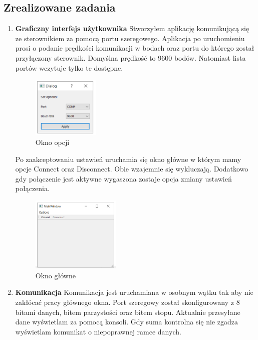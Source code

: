 \documentclass[10pt, a4paper]{article}
\begin{document}
		\subsection{Zrealizowane zadania}
			\begin{enumerate}
				\item \textbf{Graficzny interfejs użytkownika} \newline
				Stworzyłem aplikację komunikującą się ze sterownikiem za pomocą portu szeregowego. Aplikacja po uruchomieniu prosi o podanie prędkości komunikacji w bodach oraz portu do którego został przyłączony sterownik. Domyślna prędkość to 9600 bodów. Natomiast lista portów wczytuje tylko te dostępne.
				\begin{figure}[H]
					\centering
					\includegraphics[width=0.3\textwidth]{figures/opcje.png}
					\caption{Okno opcji}
					\label{fig:opcje}
				\end{figure}
				
				Po zaakceptowaniu ustawień uruchamia się okno główne w którym mamy opcje Connect oraz Disconnect. Obie wzajemnie się wykluczają. Dodatkowo gdy połączenie jest aktywne wygaszona zostaje opcja zmiany ustawień połączenia.
				
				\begin{figure}[H]
					\centering
					\includegraphics[width=0.4\textwidth]{figures/okno_glowne.png}
					\caption{Okno główne}
					\label{fig:okno_glowne}
				\end{figure}
			
				\item \textbf{Komunikacja} \newline
				Komunikacja jest uruchamiana w osobnym wątku tak aby nie zakłócać pracy głównego okna. Port szeregowy został skonfigurowany z 8 bitami danych, bitem parzystości oraz bitem stopu. Aktualnie przesyłane dane wyświetlam za pomocą konsoli. Gdy suma kontrolna się nie zgadza wyświetlam komunikat o niepoprawnej ramce danych.
			\end{enumerate}
		
\end{document}
